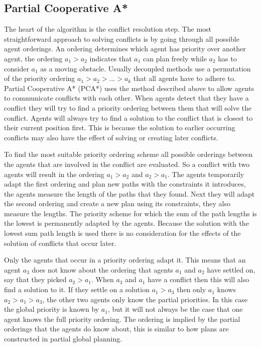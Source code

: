 \subsection{Partial Cooperative A*}
The heart of the algorithm is the conflict resolution step. The most
straightforward approach to solving conflicts is by going through all possible
agent orderings. An ordering determines which agent has priority over another
agent, the ordering $a_1 > a_2$ indicates that $a_1$ can plan freely while
$a_2$ has to consider $a_1$ as a moving obstacle. Usually decoupled methods use
a permutation of the priority ordering $a_1 > a_2 > \ldots > a_k$ that all
agents have to adhere to. Partial Cooperative A* (PCA*) uses the method
described above to allow agents to communicate conflicts with each other. When
agents detect that they have a conflict they will try to find a priority
ordering between them that will solve the conflict. Agents will always try to
find a solution to the conflict that is closest to their current position
first. This is because the solution to earlier occurring conflicts may also
have the effect of solving or creating later conflicts.

To find the most suitable priority ordering scheme all possible orderings
between the agents that are involved in the conflict are evaluated. So a
conflict with two agents will result in the ordering $a_1 > a_2$ and $a_2 >
a_1$. The agents temporarily adapt the first ordering and plan new paths with
the constraints it introduces, the agents measure the length of the paths that
they found. Next they will adapt the second ordering and create a new plan
using its constraints, they also measure the lengths. The priority scheme for
which the sum of the path lengths is the lowest is permanently adapted by the
agents. Because the solution with the lowest sum path length is used there is
no consideration for the effects of the solution of conflicts that occur later.

Only the agents that occur in a priority ordering adapt it. This means that an
agent $a_3$ does not know about the ordering that agents $a_1$ and $a_2$ have
settled on, say that they picked $a_2 > a_1$. When $a_3$ and $a_1$ have a
conflict then this will also find a solution to it. If they settle on a
solution $a_1 > a_3$ then only $a_1$ knows $a_2 > a_1 > a_3$, the other two
agents only know the partial priorities. In this case the global priority is
known by $a_1$, but it will not always be the case that one agent knows the
full priority ordering. The ordering is implied by the partial orderings that
the agents do know about, this is similar to how plans are constructed in
partial global planning.

